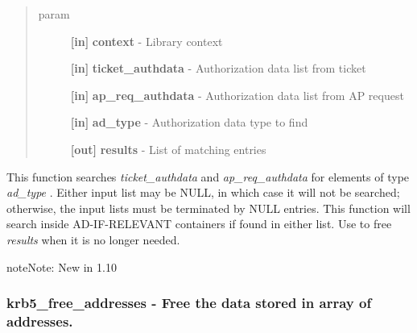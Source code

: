 \documentclass[letterpaper,10pt,english]{sphinxmanual}
\begin{document}
\begin{fulllineitems}
\label{appdev/refs/api/krb5_find_authdata:krb5_find_authdata}
\end{fulllineitems}

\begin{quote}\begin{description}
\item[{param}] \leavevmode
\textbf{{[}in{]}} \textbf{context} - Library context

\textbf{{[}in{]}} \textbf{ticket\_authdata} - Authorization data list from ticket

\textbf{{[}in{]}} \textbf{ap\_req\_authdata} - Authorization data list from AP request

\textbf{{[}in{]}} \textbf{ad\_type} - Authorization data type to find

\textbf{{[}out{]}} \textbf{results} - List of matching entries

\end{description}\end{quote}

This function searches \emph{ticket\_authdata} and \emph{ap\_req\_authdata} for elements of type \emph{ad\_type} . Either input list may be NULL, in which case it will not be searched; otherwise, the input lists must be terminated by NULL entries. This function will search inside AD-IF-RELEVANT containers if found in either list. Use {\hyperref[appdev/refs/api/krb5_free_authdata:krb5_free_authdata]{}} to free \emph{results} when it is no longer needed.

\begin{notice}{note}{Note:}
New in 1.10
\end{notice}


\subsubsection{krb5\_free\_addresses -  Free the data stored in array of addresses.}
\label{appdev/refs/api/krb5_free_addresses:krb5-free-addresses-free-the-data-stored-in-array-of-addresses}\label{appdev/refs/api/krb5_free_addresses::doc}
\end{document}
